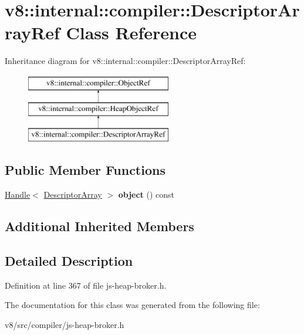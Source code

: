 \hypertarget{classv8_1_1internal_1_1compiler_1_1DescriptorArrayRef}{}\section{v8\+:\+:internal\+:\+:compiler\+:\+:Descriptor\+Array\+Ref Class Reference}
\label{classv8_1_1internal_1_1compiler_1_1DescriptorArrayRef}
Inheritance diagram for v8\+:\+:internal\+:\+:compiler\+:\+:Descriptor\+Array\+Ref\+:\begin{figure}[H]
\begin{center}
\leavevmode
\includegraphics[height=3.000000cm]{classv8_1_1internal_1_1compiler_1_1DescriptorArrayRef}
\end{center}
\end{figure}
\subsection*{Public Member Functions}
\begin{DoxyCompactItemize}
\item 
\mbox{\label{classv8_1_1internal_1_1compiler_1_1DescriptorArrayRef_a2a579165ced9df444f1a3a38268739da}} 
\mbox{\hyperlink{classv8_1_1internal_1_1Handle}{Handle}}$<$ \mbox{\hyperlink{classv8_1_1internal_1_1DescriptorArray}{Descriptor\+Array}} $>$ {\bfseries object} () const
\end{DoxyCompactItemize}
\subsection*{Additional Inherited Members}


\subsection{Detailed Description}


Definition at line 367 of file js-\/heap-\/broker.\+h.



The documentation for this class was generated from the following file\+:\begin{DoxyCompactItemize}
\item 
v8/src/compiler/js-\/heap-\/broker.\+h\end{DoxyCompactItemize}
